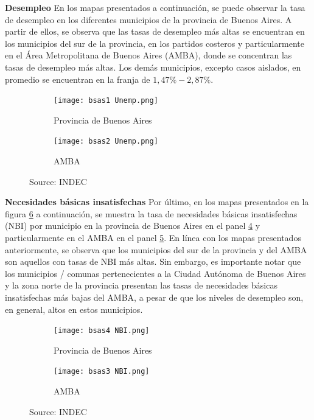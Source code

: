 \documentclass[11pt]{article}
\newcommand{\source}[1]{\caption*{Source: {#1}} }
\begin{document}
\textbf{Desempleo}
En los mapas presentados a continuación, se puede observar la tasa de desempleo en los diferentes municipios de la provincia de Buenos Aires. A partir de ellos, se observa que las tasas de desempleo más altas se encuentran en los municipios del sur de la provincia, en los partidos costeros y particularmente en el Área Metropolitana de Buenos Aires (AMBA), donde se concentran las tasas de desempleo más altas. Los demás municipios, excepto casos aislados, en promedio se encuentran en la franja de $1,47\%-2,87\%$.
\vspace{0.25cm}
\begin{figure}[H]
\caption{Tasa de desempleo}
\begin{subfigure}{.5\textwidth}
  \centering
  \texttt{[image: bsas1 Unemp.png]}  
  \caption{Provincia de Buenos Aires}
  \label{fig:1}
\end{subfigure}
\begin{subfigure}{.5\textwidth}
  \centering
  \texttt{[image: bsas2 Unemp.png]}
  \caption{AMBA}
  \label{fig:2}
\end{subfigure}
\label{fig:7}
\source{INDEC}
\end{figure}

\newpage
\textbf{Necesidades básicas insatisfechas} 
Por último, en los mapas presentados en la figura \ref{fig:8} a continuación, se muestra la tasa de necesidades básicas insatisfechas (NBI) por municipio en la provincia de Buenos Aires en el panel \ref{fig:8a} y particularmente en el AMBA en el panel \ref{fig:8b}. En línea con los mapas presentados anteriormente, se observa que los municipios del sur de la provincia y del AMBA son aquellos con tasas de NBI más altas. Sin embargo, es importante notar que los municipios / comunas pertenecientes a la Ciudad Autónoma de Buenos Aires y la zona norte de la provincia presentan las tasas de necesidades básicas insatisfechas más bajas del AMBA, a pesar de que los niveles de desempleo son, en general, altos en estos municipios. 

\begin{figure}[H]
\caption{Necesidades Básicas Insatisfechas}
\begin{subfigure}{.5\textwidth}
  \centering
  \texttt{[image: bsas4 NBI.png]}  
  \caption{Provincia de Buenos Aires}
  \label{fig:8a}
\end{subfigure}
\begin{subfigure}{.5\textwidth}
  \centering
  \texttt{[image: bsas3 NBI.png]}
  \caption{AMBA}
  \label{fig:8b}
\end{subfigure}
\label{fig:8}
\source{INDEC}
\end{figure}
\end{document}
